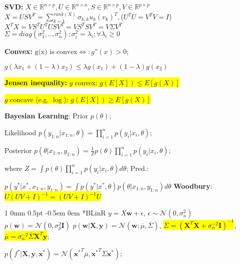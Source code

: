 \documentclass[11pt,landscape,a4paper,fleqn]{article}
\makeatletter
\newcommand*{\rsection}{%
	\@startsection{section}%
	{1}%
	{0mm}%
	{0.5pt}%
	{-0.5em \@plus 0em}
	{\color{myorange}\sffamily\small\bfseries}}
\newcommand{\mhl}[1]{\setlength{\fboxsep}{0pt}\colorbox{yellow}{#1}}
\makeatother
\begin{document}
\begin{multicols*}{4}
		\textbf{SVD:}
	$X\in \mathbb{R}^{n\times p}, U\in \mathbb{R}^{n\times n}, S\in \mathbb{R}^{n\times p},
	V\in \mathbb{R}^{p\times p}$\\
	$X=USV^T=\sum_{k=1}^{rank(X)}\sigma_{k,k}u_k (v_k)^T,\!${\tiny{($U^TU=V^TV=I$)}}\\
	$X^TX=VS^TU^TUSV^T=VS^TSV^T=V\Sigma V^T$\\
	$\Sigma = diag(\sigma_1^2,..,\sigma_n^2);\sigma_i^2=\lambda_i; \forall \lambda_i \geq 0$
		\fi




		\textbf{Convex:}
	$\text{g(x) is convex} \Leftrightarrow : g\text{''}(x) > 0$;

	$g(\lambda x_1 + (1-\lambda) x_2) \leq \lambda g(x_1) + (1-\lambda) g(x_2)$

		\mhl{\textbf{Jensen inequality: }$g$ convex: $g(E[X]) \leq E[g(X)]$}

		\mhl{$g$ concave (e.g. $\log$): $g(E[X]) \geq E[g(X)]$}

		\textbf{Bayesian Learning}:
		Prior $p(\theta)$;

		Likelihood $p(y_{1:n} | x_{1:n}, \theta) = \prod_{i=1}^{n} p(y_i | x_i, \theta)$;

		Posterior $p(\theta | x_{1:n}, y_{1:n}) = \frac{1}{Z} p(\theta) \prod_{i=1}^{n} p(y_i | x_i, \theta)$;

		where $Z = \int p(\theta) \prod_{i=1}^{n} p(y_i | x_i, \theta) d\theta$; Pred.:

	$p(y^* | x^*, x_{1:n}, y_{1:n}) = \int p(y^* | x^*, \theta) p(\theta | x_{1:n}, y_{1:n}) d\theta$
		\textbf{Woodbury}: \mhl{$U(UV + I)^{-1} = (UV + I)^{-1}U$}

		\rsection*{BLinR}
	$y = X\mathbf{w} + \epsilon$, $\epsilon \sim \mathcal{N}(0, \sigma_n^2)$
		\mbox{\fontsize{9.8}{6}\selectfont $p(\mathbf{w}) = \mathcal{N}(0,  \sigma_p^2\mathbf{I})$}
	$p(\mathbf{w} | \mathbf{X, y}) = \mathcal{N}(\mathbf{w}; \overline{\mu}, \overline{\Sigma})$,
		\mhl{$\overline{\Sigma} = (\mathbf{X}^T\mathbf{X} + \sigma_n^{-2} \mathbf{I})^{-1}$},
		\mhl{$\overline{\mu} = \sigma_n^{-2} \overline{\Sigma} \mathbf{X}^T\mathbf{y}$};

	$p(f^* | \mathbf{X,y,x^*}) = \mathcal{N}(\mathbf{x^*}^T\overline{\mu}, {\mathbf{x}^*}^T \overline{\Sigma} \mathbf{x}^*)$;


\end{multicols*}
\end{document}
